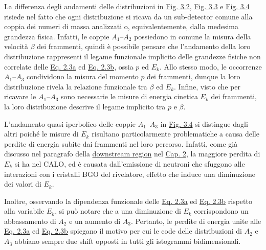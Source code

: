 \documentclass[12pt,a4paper,twoside]{report}
\begin{document}
	La differenza degli andamenti delle distribuzioni in \hyperref[fig:a1]{Fig. 3.2}, \hyperref[fig:a2]{Fig. 3.3} e \hyperref[fig:a3]{Fig. 3.4} risiede nel fatto che ogni distribuzione si ricava da un sub-detector comune alla coppia dei numeri di massa analizzati o, equivalentemente, dalla medesima grandezza fisica. Infatti, le coppie $A_1$--$A_2$ possiedono in comune la misura della velocità $\beta$ dei frammenti, quindi è possibile pensare che l'andamento della loro distribuzione rappresenti il legame funzionale implicito delle grandezze fisiche non correlate delle \hyperref[eq:a1]{Eq. 2.3a} ed \hyperref[eq:a2]{Eq. 2.3b}, ossia $p$ ed $E_k$. Allo stesso modo, le occorrenze $A_1$--$A_3$ condividono la misura del momento $p$ dei frammenti, dunque la loro distribuzione rivela la relazione funzionale tra $\beta$ ed $E_k$. Infine, visto che per ricavare le $A_1$--$A_3$ sono necessarie le misure di energia cinetica $E_k$ dei frammenti, la loro distribuzione descrive il legame implicito tra $p$ e $\beta$.
	
	L'andamento quasi iperbolico delle coppie $A_1$--$A_3$ in \hyperref[fig:a3]{Fig. 3.4} si distingue dagli altri poiché le misure di $E_k$ risultano particolarmente problematiche a causa delle perdite di energia subite dai frammenti nel loro percorso. Infatti, come già discusso nel paragrafo della \hyperref[par:downstream_region]{downstream region} nel \hyperref[cap:2]{Cap. 2}, la maggiore perdita di $E_k$ si ha nel CALO, ed è causata dall'emissione di neutroni che sfuggono alle interazioni con i cristalli BGO del rivelatore, effetto che induce una diminuzione dei valori di $E_k$.
	
	Inoltre, osservando la dipendenza funzionale delle \hyperref[eq:a1]{Eq. 2.3a} ed \hyperref[eq:a2]{Eq. 2.3b} rispetto alla variabile $E_k$, si può notare che a una diminuzione di $E_k$ corrispondono un abbassamento di $A_2$ e un aumento di $A_3$. Pertanto, le perdite di energia unite alle \hyperref[eq:a1]{Eq. 2.3a} ed \hyperref[eq:a2]{Eq. 2.3b} spiegano il motivo per cui le code delle distribuzioni di $A_2$ e $A_3$ abbiano sempre due shift opposti in tutti gli istogrammi bidimensionali.
	
\end{document}
